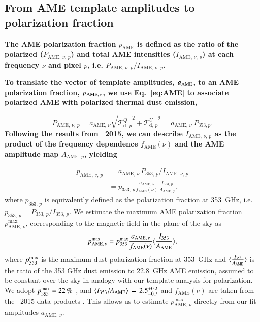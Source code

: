 \documentclass[twocolumn]{aa}
\begin{document}
\subsection{From AME template amplitudes to polarization fraction}\label{sub:ame}

\textbf{The AME polarization fraction $p_{\mathrm{AME}}$ is defined as the ratio of the polarized ($P_{\mathrm{AME},\,\nu,\,p}$) and total AME intensities ($I_{\mathrm{AME},\,\nu,\,p}$) at each frequency $\nu$ and pixel $p$, i.e. $P_{\mathrm{AME},\,\nu,\,p}/I_{\mathrm{AME},\,\nu,\,p}$.}

\textbf{To translate the vector of template amplitudes, $\boldsymbol a_{\rm AME}$, to an AME polarization fraction, $ p_{\rm AME,\,\nu}$, we use Eq.~\eqref{eq:AME} to associate polarized AME with polarized thermal dust emission,}

\begin{equation}
P_{\mathrm{AME},\,\nu,\,p}=a_{\mathrm{AME},\,\nu}\sqrt{{\mathcal{T}_{\mathrm{d},\,p}^{Q}}^2+{\mathcal{T}_{\mathrm{d},\,p}^{U}}^2}=a_{\mathrm{AME},\,\nu}~P_{353,p}.
\end{equation}
\textbf{Following the results from \Planck\ 2015, we can describe $I_{\mathrm{AME},\,\nu,\,p}$ as the product of the frequency dependence $f_{\mathrm{AME}}(\nu)$ and the AME amplitude map $A_{\mathrm{AME},\,p}$, yielding}

\begin{align}
  p_{\mathrm{AME},\,\nu,\,p} &= a_{\mathrm{AME},\, \nu}\, P_{353,\,p} / I_{\mathrm{AME},\,\nu,\,p}\\
                 &= p_{353,\,p}\frac{a_{\mathrm{AME},\, \nu}}{f_{\mathrm{AME}}(\nu)} \frac{I_{353,\,p}}{A_{\mathrm{AME},\,p}},
\label{eq:pfrac_def2}
\end{align}
where $p_{353,\,p}$ is equivalently defined as the polarization fraction at 353~GHz, i.e. $p_{353,\,p}=P_{353,\,p}/I_{353,\,p}$. We estimate the maximum AME polarization fraction $p_{\mathrm{AME},\,\nu}^{\mathrm{max}}$, corresponding to the magnetic field in the plane of the sky as
\begin{equation}
p_{\mathrm{AME},\,\nu}^{\mathrm{max}} = p_{353}^{\mathrm{max}}\frac{a_{\mathrm{AME},\, \nu}}{f_{\mathrm{AME}}(\nu)} \large\langle \frac{I_{353}}{A_{\mathrm{AME}}}\large\rangle,
\label{eq:pfrac_def3}
\end{equation}
 where $p_{353}^{\rm max}$ is the maximum dust polarization fraction at 353~GHz and $\large\langle \frac{I_{353}}{A_{\mathrm{AME}}}\large\rangle$ is the ratio of the 353 GHz dust emission to 22.8~GHz AME emission, assumed to be constant over the sky in analogy with our template analysis for polarization. We adopt $p_{353}^{\rm max} = 22\,\%$ \citep{planck2016-l11B}, and $\langle I_{\rm 353}/A_{\rm
   AME}\rangle\,=\,2.5^{+0.2}_{-0.7}$ 
 and $f_{\mathrm{AME}}(\nu)$ are taken from the \Planck\ 2015 data products \citep{planck2014-a12}. This allows us to estimate $p_{\mathrm{AME},\,\nu}^{\mathrm{max}}$ directly from our fit amplitudes $a_{\mathrm{AME},\, \nu}$.
\end{document}
